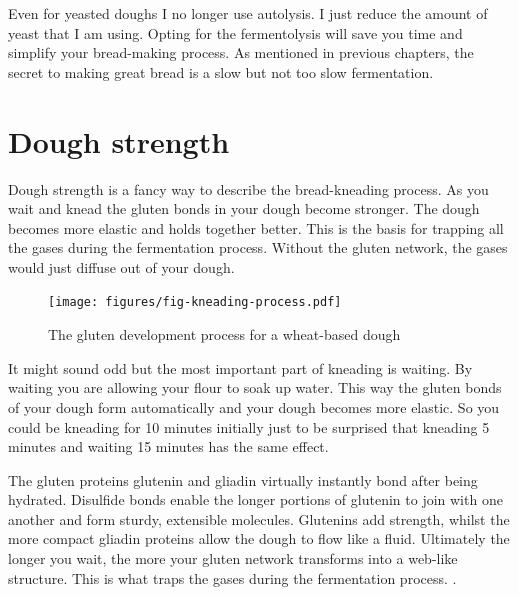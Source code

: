 Even for yeasted doughs I no longer use autolysis. I just reduce the amount
of yeast that I am using. Opting for the fermentolysis will
save you time and simplify your bread-making process. As mentioned in previous chapters,
the secret to making great bread is a slow but not too slow fermentation.

\section{Dough strength}

Dough strength is a fancy way to describe the bread-kneading process. As you wait and
knead the gluten bonds in your dough become stronger. The dough
becomes more elastic and holds together better. This is the basis for trapping
all the gases during the fermentation process. Without the gluten network,
the gases would just diffuse out of your dough.

\begin{figure}[!htb]
  \texttt{[image: figures/fig-kneading-process.pdf]}
  \caption{The gluten development process for a wheat-based dough}
  \label{fig:wheat-sourdough-kneading-process}
\end{figure}

It might sound odd but the most important part of kneading is waiting. By
waiting you are allowing your flour to soak up water. This way the gluten
bonds of your dough form automatically and your dough becomes more elastic.
So you could be kneading for 10 minutes initially just to be surprised
that kneading 5 minutes and waiting 15 minutes has the same effect.

The gluten proteins glutenin and gliadin virtually instantly bond after being
hydrated. Disulfide bonds enable the longer portions of
glutenin to join with one another and form sturdy, extensible molecules.
Glutenins add strength, whilst the more compact gliadin proteins allow
the dough to flow like a fluid. Ultimately the longer you wait, the more
your gluten network transforms into a web-like structure. This is what
traps the gases during the fermentation process. \cite{how+does+gluten+work}.

